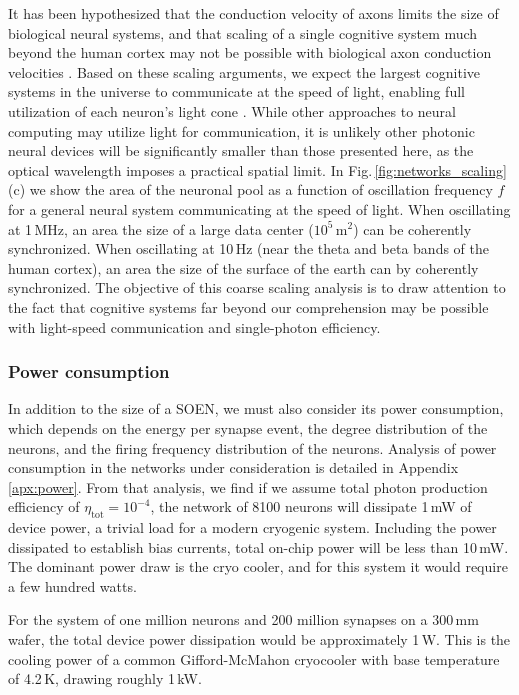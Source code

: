 \documentclass[twocolumn]{article}
\begin{document}
It has been hypothesized that the conduction velocity of axons limits the size of biological neural systems, and that scaling of a single cognitive system much beyond the human cortex may not be possible with biological axon conduction velocities \cite{rido1994,bu2006}. Based on these scaling arguments, we expect the largest cognitive systems in the universe to communicate at the speed of light, enabling full utilization of each neuron's light cone \cite{shICRC2018}. While other approaches to neural computing may utilize light for communication, it is unlikely other photonic neural devices will be significantly smaller than those presented here, as the optical wavelength imposes a practical spatial limit. In Fig.\,\ref{fig:networks_scaling}(c) we show the area of the neuronal pool as a function of oscillation frequency $f$ for a general neural system communicating at the speed of light. When oscillating at 1\,MHz, an area the size of a large data center ($10^5$\,m$^2$) can be coherently synchronized. When oscillating at 10\,Hz (near the theta and beta bands of the human cortex), an area the size of the surface of the earth can by coherently synchronized. The objective of this coarse scaling analysis is to draw attention to the fact that cognitive systems far beyond our comprehension may be possible with light-speed communication and single-photon efficiency.

\subsubsection{Power consumption}
In addition to the size of a SOEN, we must also consider its power consumption, which depends on the energy per synapse event, the degree distribution of the neurons, and the firing frequency distribution of the neurons. Analysis of power consumption in the networks under consideration is detailed in Appendix \ref{apx:power}. From that analysis, we find if we assume total photon production efficiency of $\eta_{\mathrm{tot}} = 10^{-4}$, the network of 8100 neurons will dissipate 1\,mW of device power, a trivial load for a modern cryogenic system. Including the power dissipated to establish bias currents, total on-chip power will be less than 10\,mW. The dominant power draw is the cryo cooler, and for this system it would require a few hundred watts.

For the system of one million neurons and 200 million synapses on a 300\,mm wafer, the total device power dissipation would be approximately 1\,W. This is the cooling power of a common Gifford-McMahon cryocooler with base temperature of 4.2\,K, drawing roughly 1\,kW. 
\end{document}
